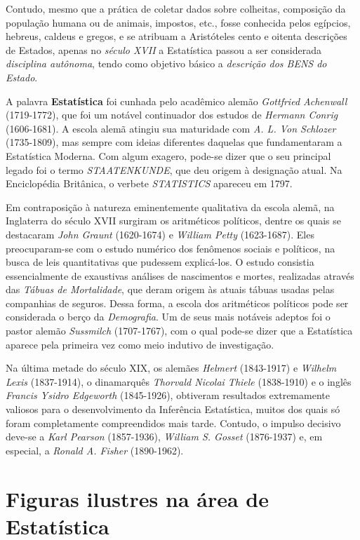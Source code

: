 \documentclass[
  letterpaper,
  DIV=11,
  numbers=noendperiod]{scrreprt}
\begin{document}
Contudo, mesmo que a prática de coletar dados sobre colheitas,
composição da população humana ou de animais, impostos, etc., fosse
conhecida pelos egípcios, hebreus, caldeus e gregos, e se atribuam a
Aristóteles cento e oitenta descrições de Estados, apenas no
\emph{século XVII} a Estatística passou a ser considerada
\emph{disciplina autônoma}, tendo como objetivo básico a \emph{descrição
dos BENS do Estado}.

A palavra \textbf{Estatística} foi cunhada pelo acadêmico alemão
\emph{Gottfried Achenwall} (1719-1772), que foi um notável continuador
dos estudos de \emph{Hermann Conrig} (1606-1681). A escola alemã atingiu
sua maturidade com \emph{A. L. Von Schlozer} (1735-1809), mas sempre com
ideias diferentes daquelas que fundamentaram a Estatística Moderna. Com
algum exagero, pode-se dizer que o seu principal legado foi o termo
\emph{STAATENKUNDE}, que deu origem à designação atual. Na Enciclopédia
Britânica, o verbete \emph{STATISTICS} apareceu em 1797.

Em contraposição à natureza eminentemente qualitativa da escola alemã,
na Inglaterra do século XVII surgiram os aritméticos políticos, dentre
os quais se destacaram \emph{John Graunt} (1620-1674) e \emph{William
Petty} (1623-1687). Eles preocuparam-se com o estudo numérico dos
fenômenos sociais e políticos, na busca de leis quantitativas que
pudessem explicá-los. O estudo consistia essencialmente de exaustivas
análises de nascimentos e mortes, realizadas através das \emph{Tábuas de
Mortalidade}, que deram origem às atuais tábuas usadas pelas companhias
de seguros. Dessa forma, a escola dos aritméticos políticos pode ser
considerada o berço da \emph{Demografia}. Um de seus mais notáveis
adeptos foi o pastor alemão \emph{Sussmilch} (1707-1767), com o qual
pode-se dizer que a Estatística aparece pela primeira vez como meio
indutivo de investigação.

Na última metade do século XIX, os alemães \emph{Helmert} (1843-1917) e
\emph{Wilhelm Lexis} (1837-1914), o dinamarquês \emph{Thorvald Nicolai
Thiele} (1838-1910) e o inglês \emph{Francis Ysidro Edgeworth}
(1845-1926), obtiveram resultados extremamente valiosos para o
desenvolvimento da Inferência Estatística, muitos dos quais só foram
completamente compreendidos mais tarde. Contudo, o impulso decisivo
deve-se a \emph{Karl Pearson} (1857-1936), \emph{William S. Gosset}
(1876-1937) e, em especial, a \emph{Ronald A. Fisher} (1890-1962).

\section{Figuras ilustres na área de
Estatística}\label{figuras-ilustres-na-uxe1rea-de-estatuxedstica}
\end{document}
